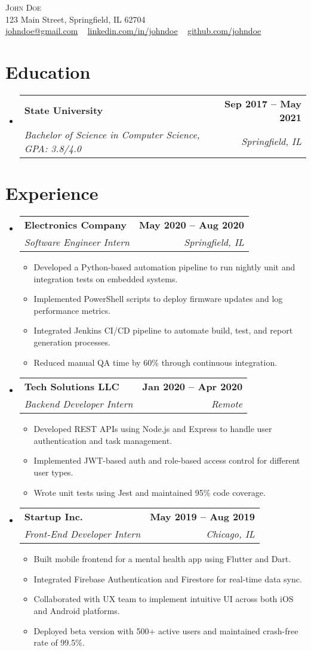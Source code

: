 \documentclass[letterpaper,11pt]{article}
\makeatletter
\newcommand{\resumeItem}[1]{
  \item\small{#1 \vspace{-2pt}}
}
\newcommand{\resumeSubheading}[4]{
  \vspace{-2pt}\item
    \begin{tabular*}{1.0\textwidth}[t]{l@{\extracolsep{\fill}}r}
      \textbf{#1} & \textbf{\small #2} \\
      \textit{\small#3} & \textit{\small #4} \\
    \end{tabular*}\vspace{-7pt}
}
\newcommand{\resumeItemListStart}{\begin{itemize}}
\newcommand{\resumeItemListEnd}{\end{itemize}\vspace{-5pt}}
\newcommand{\resumeSubHeadingListStart}{\begin{itemize}[leftmargin=0.0in, label={}]}
\newcommand{\resumeSubHeadingListEnd}{\end{itemize}}
\makeatother
\begin{document}
\begin{center}
    {\Huge \scshape John Doe} \\ \vspace{1pt}
    123 Main Street, Springfield, IL 62704 \\ \vspace{1pt}
    \href{mailto:johndoe@gmail.com}{johndoe@gmail.com} ~
    \href{https://linkedin.com/in/johndoe}{linkedin.com/in/johndoe} ~
    \href{https://github.com/johndoe}{github.com/johndoe}
\end{center}

\section{Education}
\resumeSubHeadingListStart
  \resumeSubheading
    {State University}{Sep 2017 -- May 2021}
    {Bachelor of Science in Computer Science, GPA: 3.8/4.0}{Springfield, IL}
\resumeSubHeadingListEnd

\section{Experience}
\resumeSubHeadingListStart
  \resumeSubheading
    {Electronics Company}{May 2020 -- Aug 2020}
    {Software Engineer Intern}{Springfield, IL}
    \resumeItemListStart
      \resumeItem{Developed a Python-based automation pipeline to run nightly unit and integration tests on embedded systems.}
      \resumeItem{Implemented PowerShell scripts to deploy firmware updates and log performance metrics.}
      \resumeItem{Integrated Jenkins CI/CD pipeline to automate build, test, and report generation processes.}
      \resumeItem{Reduced manual QA time by 60\% through continuous integration.}
    \resumeItemListEnd

    \resumeSubheading
    {Tech Solutions LLC}{Jan 2020 -- Apr 2020}
    {Backend Developer Intern}{Remote}
    \resumeItemListStart
      \resumeItem{Developed REST APIs using Node.js and Express to handle user authentication and task management.}
      \resumeItem{Implemented JWT-based auth and role-based access control for different user types.}
      \resumeItem{Wrote unit tests using Jest and maintained 95\% code coverage.}
    \resumeItemListEnd

  \resumeSubheading
    {Startup Inc.}{May 2019 -- Aug 2019}
    {Front-End Developer Intern}{Chicago, IL}
    \resumeItemListStart
      \resumeItem{Built mobile frontend for a mental health app using Flutter and Dart.}
      \resumeItem{Integrated Firebase Authentication and Firestore for real-time data sync.}
      \resumeItem{Collaborated with UX team to implement intuitive UI across both iOS and Android platforms.}
      \resumeItem{Deployed beta version with 500+ active users and maintained crash-free rate of 99.5\%.}
    \resumeItemListEnd
\resumeSubHeadingListEnd
\end{document}
